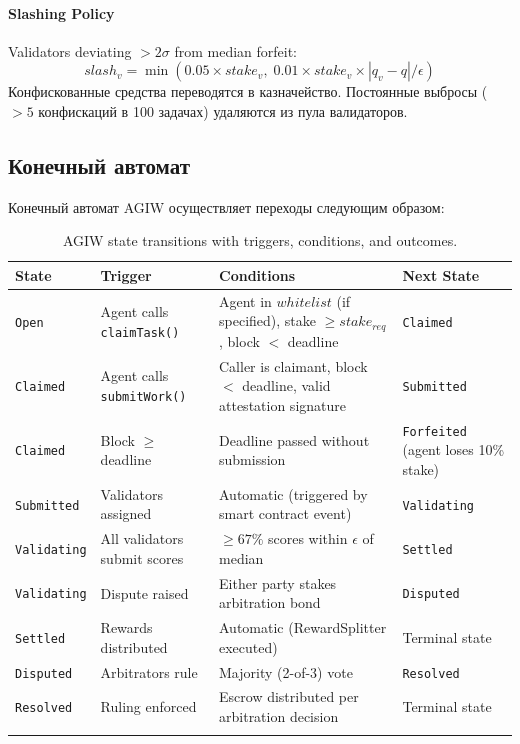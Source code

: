 \documentclass[11pt]{article}
\begin{document}
\paragraph{Slashing Policy} Validators deviating $>2\sigma$ from median forfeit:
\begin{equation}
slash_v = \min(0.05 \times stake_v, \; 0.01 \times stake_v \times |q_v - q| / \epsilon)
\end{equation}
Конфискованные средства переводятся в казначейство. Постоянные выбросы ($>5$ конфискаций в 100 задачах) удаляются из пула валидаторов.

\subsection{Конечный автомат}
\label{sec:agiw-state-machine}
Конечный автомат AGIW осуществляет переходы следующим образом:
\begin{longtable}{@{}p{}p{}p{}p{}@{}}
\toprule
\textbf{State} & \textbf{Trigger} & \textbf{Conditions} & \textbf{Next State} \\\midrule
\texttt{Open} & Agent calls \texttt{claimTask()} & Agent in $whitelist$ (if specified), stake $\geq stake_{req}$, block $<$ deadline & \texttt{Claimed} \\
\texttt{Claimed} & Agent calls \texttt{submitWork()} & Caller is claimant, block $<$ deadline, valid attestation signature & \texttt{Submitted} \\
\texttt{Claimed} & Block $\geq$ deadline & Deadline passed without submission & \texttt{Forfeited} (agent loses 10\% stake) \\
\texttt{Submitted} & Validators assigned & Automatic (triggered by smart contract event) & \texttt{Validating} \\
\texttt{Validating} & All validators submit scores & $\geq 67\%$ scores within $\epsilon$ of median & \texttt{Settled} \\
\texttt{Validating} & Dispute raised & Either party stakes arbitration bond & \texttt{Disputed} \\
\texttt{Settled} & Rewards distributed & Automatic (RewardSplitter executed) & Terminal state \\
\texttt{Disputed} & Arbitrators rule & Majority (2-of-3) vote & \texttt{Resolved} \\
\texttt{Resolved} & Ruling enforced & Escrow distributed per arbitration decision & Terminal state \\\bottomrule
\caption{AGIW state transitions with triggers, conditions, and outcomes.}
\label{tab:agiw-states}
\end{longtable}
\end{document}
